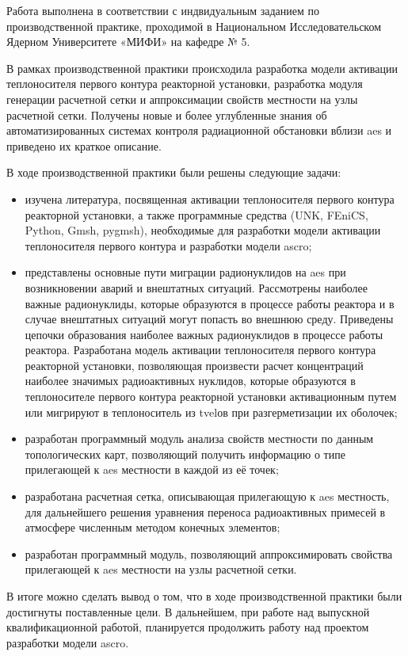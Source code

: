 
Работа выполнена в соответствии с индвидуальным заданием по производственной практике, проходимой в Национальном 
Исследовательском Ядерном Университете «МИФИ» на кафедре № 5.

В рамках производственной практики происходила разработка модели активации теплоносителя первого контура реакторной 
установки, разработка модуля генерации расчетной сетки и аппроксимации свойств местности на узлы расчетной сетки. 
Получены новые и более углубленные знания об автоматизированных системах контроля радиационной обстановки вблизи 
\ac{aes} и приведено их краткое описание.

В ходе производственной практики были решены следующие задачи:
\begin{itemize}
	\item изучена литература, посвященная активации теплоносителя первого контура реакторной установки, а также 
	программные средства (UNK, FEniCS, Python, Gmsh, pygmsh), необходимые для разработки модели активации теплоносителя 
	первого контура и разработки модели \ac{ascro};
	\item представлены основные пути миграции радионуклидов на \ac{aes} при возникновении аварий и внештатных ситуаций. 
	Рассмотрены наиболее важные радионуклиды, которые образуются в процессе работы реактора и в случае внештатных 
	ситуаций могут попасть во внешнюю среду. Приведены цепочки образования наиболее важных радионуклидов в процессе 
	работы реактора. Разработана модель активации теплоносителя первого контура реакторной установки, позволяющая 
	произвести расчет концентраций наиболее значимых радиоактивных нуклидов, которые образуются в теплоносителе первого 
	контура реакторной установки активационным путем или мигрируют в теплоноситель из \ac{tvel}ов при разгерметизации 
	их оболочек;
	\item разработан программный модуль анализа свойств местности по данным топологических карт, позволяющий получить 
	информацию о типе прилегающей к \ac{aes} местности в каждой из её точек;
	\item разработана расчетная сетка, описывающая прилегающую к \ac{aes} местность, для дальнейшего решения уравнения 
	переноса радиоактивных примесей в атмосфере численным методом конечных элементов;
	\item разработан программный модуль, позволяющий аппроксимировать свойства прилегающей к \ac{aes} местности на узлы 
	расчетной сетки. 
\end{itemize}

В итоге можно сделать вывод о том, что в ходе производственной практики были достигнуты поставленные цели. В дальнейшем,
при работе над выпускной квалификационной работой, планируется продолжить работу над проектом разработки модели \ac{ascro}.   